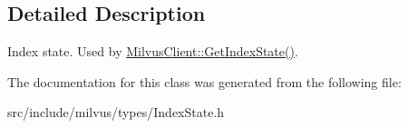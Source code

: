 \subsection{Detailed Description}
Index state. Used by \hyperlink{classmilvus_1_1_milvus_client_ad4abd1fc1153cd777a5080aa2ad8ca2b}{Milvus\+Client\+::\+Get\+Index\+State()}. 

The documentation for this class was generated from the following file\+:\begin{DoxyCompactItemize}
\item 
src/include/milvus/types/Index\+State.\+h\end{DoxyCompactItemize}
